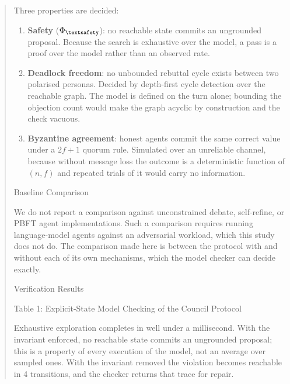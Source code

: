 \documentclass[10pt,journal,compsoc,twocolumn]{IEEEtran}
\begin{document}
\begin{quote}
{Three properties are decided:

\begin{enumerate}
  \item \textbf{Safety} ($\Phi_{\textsafety}$): no reachable state commits an ungrounded proposal. Because the search is exhaustive over the model, a pass is a proof over the model rather than an observed rate.
  \item \textbf{Deadlock freedom}: no unbounded rebuttal cycle exists between two polarised personas. Decided by depth-first cycle detection over the reachable graph. The model is defined on the turn alone; bounding the objection count would make the graph acyclic by construction and the check vacuous.
  \item \textbf{Byzantine agreement}: honest agents commit the same correct value under a $2f+1$ quorum rule. Simulated over an unreliable channel, because without message loss the outcome is a deterministic function of $(n, f)$ and repeated trials of it would carry no information.
\end{enumerate}

 Baseline Comparison

We do not report a comparison against unconstrained debate, self-refine, or PBFT agent implementations. Such a comparison requires running language-model agents against an adversarial workload, which this study does not do. The comparison made here is between the protocol with and without each of its own mechanisms, which the model checker can decide exactly.



 Verification Results

 Table 1: Explicit-State Model Checking of the Council Protocol
\begin{table}[htbp]
\centering
{}
\end{table}

Exhaustive exploration completes in well under a millisecond. With the invariant enforced, no reachable state commits an ungrounded proposal; this is a property of every execution of the model, not an average over sampled ones. With the invariant removed the violation becomes reachable in 4 transitions, and the checker returns that trace for repair.

}
\end{quote}
\end{document}
